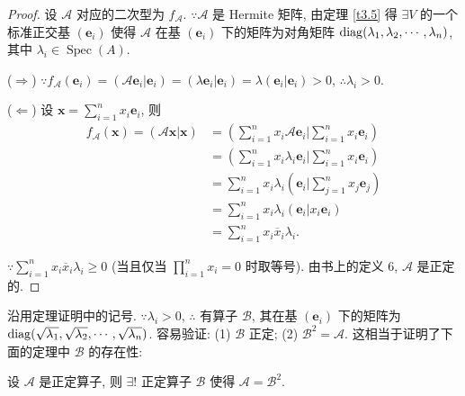 \documentclass{ctexart}
\begin{document}
\begin{proof}
    设 $\mathcal{A}$ 对应的二次型为 $f_\mathcal{A}$. $\because\mathcal{A}$ 是 Hermite 矩阵, 由定理 \ref{t3.5} 得 $\exists V$ 的一个标准正交基 $(\boldsymbol{e}_i)$ 使得 $\mathcal{A}$ 在基 $(\boldsymbol{e}_i)$ 下的矩阵为对角矩阵 $\operatorname{diag} (\lambda_1,\lambda_2,\cdots,\lambda_n)$, 其中 $\lambda_i\in\operatorname{Spec}(A)$.

    ($\Rightarrow$) $\because f_\mathcal{A}(\boldsymbol{e}_i)=(\mathcal{A}\boldsymbol{e}_i|\boldsymbol{e}_i)=(\lambda\boldsymbol{e}_i|\boldsymbol{e}_i)=\lambda(\boldsymbol{e}_i|\boldsymbol{e}_i)>0$, $\therefore\lambda_i>0$.

    ($\Leftarrow$) 设 $\boldsymbol{x}=\sum\limits_{i=1}^nx_i\boldsymbol{e}_i$, 则
    \begin{align*}
        f_\mathcal{A}(\boldsymbol{x})=(\mathcal{A}\boldsymbol{x}|\boldsymbol{x}) & =\left(\sum\limits_{i=1}^nx_i\mathcal{A}\boldsymbol{e}_i\Bigg|\sum\limits_{i=1}^nx_i\boldsymbol{e}_i\right) \\
        & =\left(\sum\limits_{i=1}^nx_i\lambda_i\boldsymbol{e}_i\Bigg|\sum\limits_{i=1}^nx_i\boldsymbol{e}_i\right) \\
        & =\sum\limits_{i=1}^nx_i\lambda_i\left(\boldsymbol{e}_i\Bigg|\sum\limits_{j=1}^nx_j\boldsymbol{e}_j\right) \\
        & =\sum\limits_{i=1}^nx_i\lambda_i\left(\boldsymbol{e}_i|x_i\boldsymbol{e}_i\right) \\
        & =\sum\limits_{i=1}^nx_i\overline{x}_i\lambda_i.
    \end{align*}

    $\because\sum\limits_{i=1}^nx_i\overline{x}_i\lambda_i\geq0$ (当且仅当 $\prod\limits_{i=1}^nx_i=0$ 时取等号). 由书上的定义 6, $\mathcal{A}$ 是正定的.
\end{proof}
沿用定理证明中的记号. $\because\lambda_i>0$, $\therefore$ 有算子 $\mathcal{B}$, 其在基 $(\boldsymbol{e}_i)$ 下的矩阵为 $\operatorname{diag} (\sqrt{\lambda_1},\sqrt{\lambda_2},\cdots,\sqrt{\lambda_n})$. 容易验证: (1) $\mathcal{B}$ 正定; (2) $\mathcal{B}^2=\mathcal{A}$. 这相当于证明了下面的定理中 $\mathcal{B}$ 的存在性:
\begin{theorem}[书上的命题 1]
    设 $\mathcal{A}$ 是正定算子, 则 $\exists!$ 正定算子 $\mathcal{B}$ 使得 $\mathcal{A}=\mathcal{B}^2$.
\end{theorem}
\end{document}
